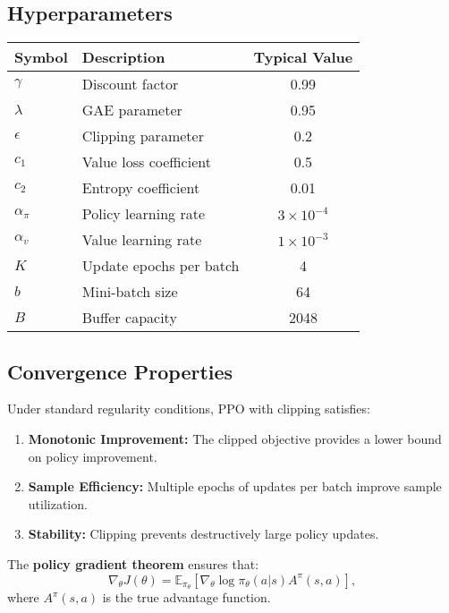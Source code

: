 \documentclass[11pt]{article}
\begin{document}
\subsection{Hyperparameters}

\begin{table}[h]
\begin{center}
\begin{tabular}{|l|l|c|}
\hline
Symbol & Description & Typical Value\\
\hline
$\gamma$ & Discount factor & 0.99 \\
\hline
$\lambda$ & GAE parameter & 0.95 \\
\hline
$\epsilon$ & Clipping parameter & 0.2 \\
\hline
$c_1$ & Value loss coefficient & 0.5 \\
\hline
$c_2$ & Entropy coefficient & 0.01 \\
\hline
$\alpha_\pi$ & Policy learning rate & $3 \times 10^{-4}$ \\
\hline
$\alpha_v$ & Value learning rate & $1 \times 10^{-3}$ \\
\hline
$K$ & Update epochs per batch & 4 \\
\hline
$b$ & Mini-batch size & 64 \\
\hline
$B$ & Buffer capacity & 2048 \\
\hline
\end{tabular}
\end{center}
\end{table}



\subsection{Convergence Properties}
Under standard regularity conditions, PPO with clipping satisfies:

\begin{enumerate}
  \item \textbf{Monotonic Improvement:} The clipped objective provides a lower bound on policy improvement.
  \item \textbf{Sample Efficiency:} Multiple epochs of updates per batch improve sample utilization.
  \item \textbf{Stability:} Clipping prevents destructively large policy updates.
\end{enumerate}

The \textbf{policy gradient theorem} ensures that:
\[
\nabla_\theta J(\theta) = \mathbb{E}_{\pi_\theta} \left[ \nabla_\theta \log \pi_\theta(a|s) A^\pi(s,a) \right],
\]
where $A^\pi(s,a)$ is the true advantage function.
\end{document}
